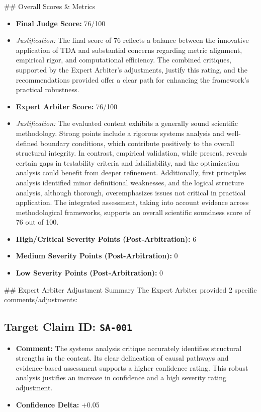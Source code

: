 \documentclass[12pt]{article}
\begin{document}
\hrulefill
\#\# Overall Scores \& Metrics
\begin{itemize}
  \item \textbf{Final Judge Score:} 76/100
  \item \textit{Justification:} The final score of 76 reflects a balance between the innovative application of TDA and substantial concerns regarding metric alignment, empirical rigor, and computational efficiency. The combined critiques, supported by the Expert Arbiter's adjustments, justify this rating, and the recommendations provided offer a clear path for enhancing the framework's practical robustness.
  \item \textbf{Expert Arbiter Score:} 76/100
  \item \textit{Justification:} The evaluated content exhibits a generally sound scientific methodology. Strong points include a rigorous systems analysis and well-defined boundary conditions, which contribute positively to the overall structural integrity. In contrast, empirical validation, while present, reveals certain gaps in testability criteria and falsifiability, and the optimization analysis could benefit from deeper refinement. Additionally, first principles analysis identified minor definitional weaknesses, and the logical structure analysis, although thorough, overemphasizes issues not critical in practical application. The integrated assessment, taking into account evidence across methodological frameworks, supports an overall scientific soundness score of 76 out of 100.
  \item \textbf{High/Critical Severity Points (Post-Arbitration):} 6
  \item \textbf{Medium Severity Points (Post-Arbitration):} 0
  \item \textbf{Low Severity Points (Post-Arbitration):} 0
\end{itemize}
\hrulefill
\#\# Expert Arbiter Adjustment Summary
The Expert Arbiter provided 2 specific comments/adjustments:
\subsection{\textbf{Target Claim ID:} \texttt{SA-001}}
\begin{itemize}
  \item \textbf{Comment:} The systems analysis critique accurately identifies structural strengths in the content. Its clear delineation of causal pathways and evidence-based assessment supports a higher confidence rating. This robust analysis justifies an increase in confidence and a high severity rating adjustment.
  \item \textbf{Confidence Delta:} +0.05
\end{itemize}
\end{document}

